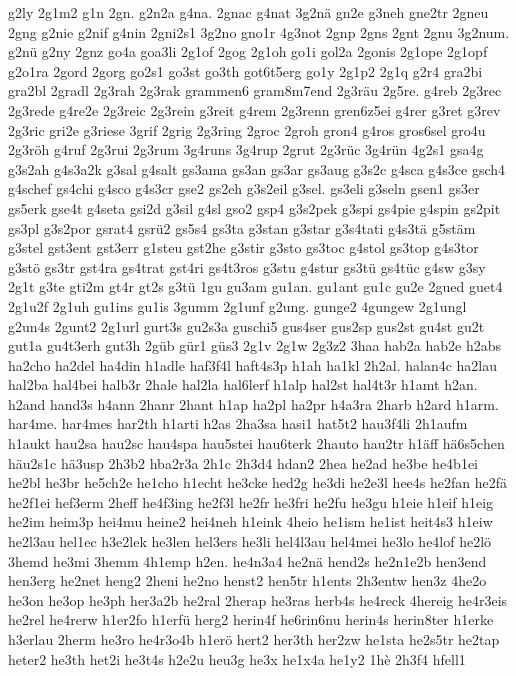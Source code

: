{g2ly
2g1m2
g1n
2gn.
g2n2a
g4na.
2gnac
g4nat
3g2nä
gn2e
g3neh
gne2tr
2gneu
2gng
g2nie
g2nif
g4nin
2gni2s1
3g2no
gno1r
4g3not
2gnp
2gns
2gnt
2gnu
3g2num.
g2nü
g2ny
2gnz
go4a
goa3li
2g1of
2gog
2g1oh
go1i
gol2a
2gonis
2g1ope
2g1opf
g2o1ra
2gord
2gorg
go2s1
go3st
go3th
got6t5erg
go1y
2g1p2
2g1q
g2r4
gra2bi
gra2bl
2gradl
2g3rah
2g3rak
grammen6
gram8m7end
2g3räu
2g5re.
g4reb
2g3rec
2g3rede
g4re2e
2g3reic
2g3rein
g3reit
g4rem
2g3renn
gren6z5ei
g4rer
g3ret
g3rev
2g3ric
gri2e
g3riese
3grif
2grig
2g3ring
2groc
2groh
gron4
g4ros
gros6sel
gro4u
2g3röh
g4ruf
2g3rui
2g3rum
3g4runs
3g4rup
2grut
2g3rüc
3g4rün
4g2s1
gsa4g
g3s2ah
g4s3a2k
g3sal
g4salt
gs3ama
gs3an
gs3ar
gs3aug
g3s2c
g4sca
g4s3ce
gsch4
g4schef
gs4chi
g4sco
g4s3cr
gse2
gs2eh
g3s2eil
g3sel.
gs3eli
g3seln
gsen1
gs3er
gs5erk
gse4t
g4seta
gsi2d
g3sil
g4sl
gso2
gsp4
g3s2pek
g3spi
gs4pie
g4spin
gs2pit
gs3pl
g3s2por
gsrat4
gsrü2
gs5s4
gs3ta
g3stan
g3star
g3s4tati
g4s3tä
g5stäm
g3stel
gst3ent
gst3err
g1steu
gst2he
g3stir
g3sto
gs3toc
g4stol
gs3top
g4s3tor
g3stö
gs3tr
gst4ra
gs4trat
gst4ri
gs4t3ros
g3stu
g4stur
gs3tü
gs4tüc
g4sw
g3sy
2g1t
g3te
gti2m
gt4r
gt2s
g3tü
1gu
gu3am
gu1an.
gu1ant
gu1c
gu2e
2gued
guet4
2g1u2f
2g1uh
gu1ins
gu1is
3gumm
2g1unf
g2ung.
gunge2
4gungew
2g1ungl
g2un4s
2gunt2
2g1url
gurt3s
gu2s3a
guschi5
gus4ser
gus2sp
gus2st
gu4st
gu2t
gut1a
gu4t3erh
gut3h
2güb
gür1
güs3
2g1v
2g1w
2g3z2
3haa
hab2a
hab2e
h2abs
ha2cho
ha2del
ha4din
h1adle
haf3f4l
haft4s3p
h1ah
ha1kl
2h2al.
halan4c
ha2lau
hal2ba
hal4bei
halb3r
2hale
hal2la
hal6lerf
h1alp
hal2st
hal4t3r
h1amt
h2an.
h2and
hand3s
h4ann
2hanr
2hant
h1ap
ha2pl
ha2pr
h4a3ra
2harb
h2ard
h1arm.
har4me.
har4mes
har2th
h1arti
h2as
2ha3sa
hasi1
hat5t2
hau3f4li
2h1aufm
h1aukt
hau2sa
hau2sc
hau4spa
hau5stei
hau6terk
2hauto
hau2tr
h1äff
hä6s5chen
häu2s1c
hä3usp
2h3b2
hba2r3a
2h1c
2h3d4
hdan2
2hea
he2ad
he3be
he4b1ei
he2bl
he3br
he5ch2e
he1cho
h1echt
he3cke
hed2g
he3di
he2e3l
hee4s
he2fan
he2fä
he2f1ei
hef3erm
2heff
he4f3ing
he2f3l
he2fr
he3fri
he2fu
he3gu
h1eie
h1eif
h1eig
he2im
heim3p
hei4mu
heine2
hei4neh
h1eink
4heio
he1ism
he1ist
heit4s3
h1eiw
he2l3au
hel1ec
h3e2lek
he3len
hel3ers
he3li
hel4l3au
hel4mei
he3lo
he4lof
he2lö
3hemd
he3mi
3hemm
4h1emp
h2en.
he4n3a4
he2nä
hend2s
he2n1e2b
hen3end
hen3erg
he2net
heng2
2heni
he2no
henst2
hen5tr
h1ents
2h3entw
hen3z
4he2o
he3on
he3op
he3ph
her3a2b
he2ral
2herap
he3ras
herb4s
he4reck
4hereig
he4r3eis
he2rel
he4rerw
h1er2fo
h1erfü
herg2
herin4f
he6rin6nu
herin4s
herin8ter
h1erke
h3erlau
2herm
he3ro
he4r3o4b
h1erö
hert2
her3th
her2zw
he1sta
he2s5tr
he2tap
heter2
he3th
het2i
he3t4s
h2e2u
heu3g
he3x
he1x4a
he1y2
1hè
2h3f4
hfell1
}
